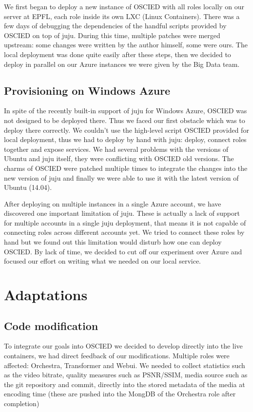 \documentclass[a4paper,12pt]{article}
\begin{document}
We first began to deploy a new instance of OSCIED with all roles locally on our server at EPFL, each role inside its own LXC (Linux Containers).
There was a few days of debugging the dependencies of the handful scripts provided by OSCIED on top of juju.
During this time, multiple patches were merged upstream: some changes were written by the author himself, some were ours.
The local deployment was done quite easily after these steps, then we decided to deploy in parallel on our Azure instances we were given by the Big Data team.

\subsection{Provisioning on Windows Azure}
In spite of the recently built-in support of juju for Windows Azure, OSCIED was not designed to be deployed there.
Thus we faced our first obstacle which was to deploy there correctly.
We couldn't use the high-level script OSCIED provided for local deployment, thus we had to deploy by hand with juju: deploy, connect roles together and expose services.
We had several problems with the versions of Ubuntu and juju itself, they were conflicting with OSCIED old versions.
The charms of OSCIED were patched multiple times to integrate the changes into the new version of juju and finally we were able to use it with the latest version of Ubuntu (14.04).

After deploying on multiple instances in a single Azure account, we have discovered one important limitation of juju.
These is actually a lack of support for multiple accounts in a single juju deployment, that means it is not capable of connecting roles across different accounts yet.
We tried to connect these roles by hand but we found out this limitation would disturb how one can deploy OSCIED.
By lack of time, we decided to cut off our experiment over Azure and focused our effort on writing what we needed on our local service.

\section{Adaptations}

\subsection{Code modification}
To integrate our goals into OSCIED we decided to develop directly into the live containers, we had direct feedback of our modifications.
Multiple roles were affected: Orchestra, Transformer and Webui.
We needed to collect statistics such as the video bitrate, quality measures such as PSNR/SSIM, media source such as the git repository and commit, directly into the stored metadata of the media at encoding time (these are pushed into the MongDB of the Orchestra role after completion)
\end{document}
